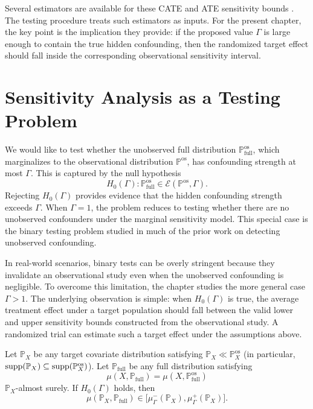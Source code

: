 Several estimators are available for these CATE and ATE sensitivity bounds \citep{kallus2019interval,zhao2019sensitivity,jesson2021quantifying,dorn2021doubly,dorn2022sharp,oprescu2023b}. The testing procedure treats such estimators as inputs. For the present chapter, the key point is the implication they provide: if the proposed value \(\Gamma\) is large enough to contain the true hidden confounding, then the randomized target effect should fall inside the corresponding observational sensitivity interval.

\section{Sensitivity Analysis as a Testing Problem}
\label{sec:confounding-testing-problem}

We would like to test whether the unobserved full distribution \(\mathbb{P}^{\mathrm{os}}_{\mathrm{full}}\), which marginalizes to the observational distribution \(\mathbb{P}^{\mathrm{os}}\), has confounding strength at most \(\Gamma\). This is captured by the null hypothesis
\[
  H_0(\Gamma):
  \mathbb{P}^{\mathrm{os}}_{\mathrm{full}}
  \in
  \mathcal{E}(\mathbb{P}^{\mathrm{os}},\Gamma).
\]
Rejecting \(H_0(\Gamma)\) provides evidence that the hidden confounding strength exceeds \(\Gamma\). When \(\Gamma=1\), the problem reduces to testing whether there are no unobserved confounders under the marginal sensitivity model. This special case is the binary testing problem studied in much of the prior work on detecting unobserved confounding.

In real-world scenarios, binary tests can be overly stringent because they invalidate an observational study even when the unobserved confounding is negligible. To overcome this limitation, the chapter studies the more general case \(\Gamma>1\). The underlying observation is simple: when \(H_0(\Gamma)\) is true, the average treatment effect under a target population should fall between the valid lower and upper sensitivity bounds constructed from the observational study. A randomized trial can estimate such a target effect under the assumptions above.

\begin{lemma}
\label{lem:confounding-testing-observation}
Let \(\mathbb{P}_X\) be any target covariate distribution satisfying \(\mathbb{P}_X \ll \mathbb{P}^{\mathrm{os}}_X\) (in particular, \(\operatorname{supp}(\mathbb{P}_X) \subseteq \operatorname{supp}(\mathbb{P}^{\mathrm{os}}_X)\)).
Let \(\mathbb{P}_{\mathrm{full}}\) be any full distribution satisfying
\[
  \mu(X,\mathbb{P}_{\mathrm{full}})
  =
  \mu(X,\mathbb{P}^{\mathrm{os}}_{\mathrm{full}})
\]
\(\mathbb{P}_X\)-almost surely.
If \(H_0(\Gamma)\) holds, then
\[
  \mu(\mathbb{P}_X,\mathbb{P}_{\mathrm{full}})
  \in
  \bigl[
    \mu^-_{\Gamma}(\mathbb{P}_X),
    \mu^+_{\Gamma}(\mathbb{P}_X)
  \bigr].
\]
\end{lemma}

